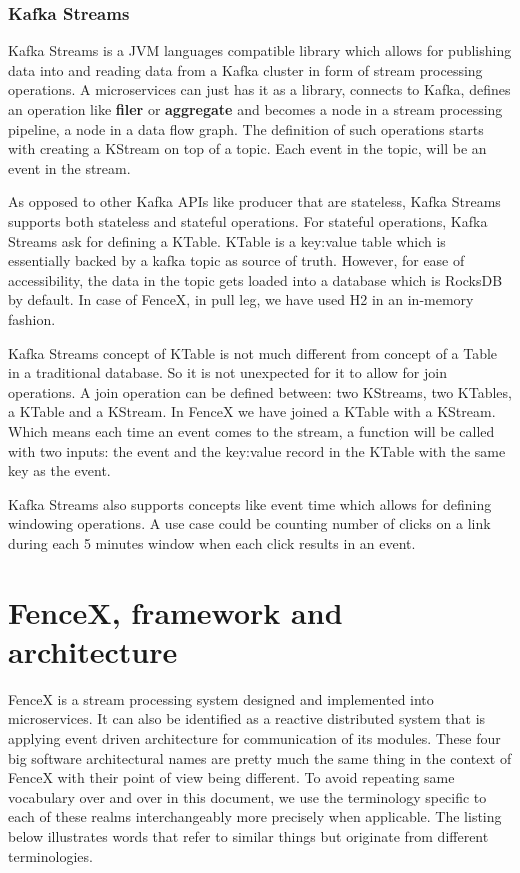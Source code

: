 \documentclass[a4]{report}
\begin{document}
    \subsection{Kafka Streams}
    Kafka Streams\cite{kafkaStreamsJoins} is a JVM languages compatible library which allows for publishing
    data into and reading data from a Kafka cluster in form of stream processing operations.
    A microservices can just has it as a library, connects to Kafka, defines an operation like \textbf{filer} or
    \textbf{aggregate} and becomes a node in a stream processing pipeline, a node in a data flow graph.
    The definition of such operations starts with creating a KStream on top of a topic.
    Each event in the topic, will be an event in the stream.

    As opposed to other Kafka APIs like producer that are stateless, Kafka Streams supports both stateless and
    stateful operations.
    For stateful operations, Kafka Streams ask for defining a KTable.
    KTable is a key:value table which is essentially backed by a kafka topic as source of truth.
    However, for ease of accessibility, the data in the topic gets loaded into a database which is RocksDB by default.
    In case of FenceX, in pull leg, we have used H2 in an in-memory fashion.

    Kafka Streams concept of KTable is not much different from concept of a Table in a traditional database.
    So it is not unexpected for it to allow for join operations.
    A join operation can be defined between: two KStreams, two KTables, a KTable and a KStream.
    In FenceX we have joined a KTable with a KStream.
    Which means each time an event comes to the stream, a function will be called with two inputs: the event and the
    key:value record in the KTable with the same key as the event.

    Kafka Streams also supports concepts like event time which allows for defining windowing operations.
    A use case could be counting number of clicks on a link during each 5 minutes window when each click results in
    an event.


    \chapter{FenceX, framework and architecture}
    FenceX is a stream processing system designed and implemented into microservices.
    It can also be identified as a reactive distributed system that is applying event driven architecture for
    communication of its modules.
    These four big software architectural names are pretty much the same thing in the context of FenceX with their
    point of view being different.
    To avoid repeating same vocabulary over and over in this document, we use the terminology specific to each of
    these realms interchangeably more precisely when applicable.
    The listing below illustrates words that refer to similar things but originate from different terminologies.
\end{document}
